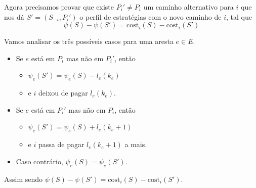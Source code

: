 \documentclass[12pt, letterpaper]{article}
\begin{document}
	Agora precisamos provar que existe $P_i' \neq P_i$ um caminho alternativo para $i$ que nos dá $S' = (S_{-i}, P_i')$ o perfil de estratégias com o novo caminho de $i$, tal que
	$$
		\psi(S) - \psi(S') = \textrm{cost}_i(S) - \textrm{cost}_i(S')
	$$

	Vamos analisar os três possíveis casos para uma aresta $e \in E$.
	\begin{itemize}
		\item{Se $e$ está em $P_i$ mas não em $P_i'$, então}
		\begin{itemize}
			\item{$\psi_e(S') = \psi_e(S) - l_e(k_e)$}
			\item{e $i$ deixou de pagar $l_e(k_e)$.}
		\end{itemize}
		\item{Se $e$ está em $P_i'$ mas não em $P_i$, então}
		\begin{itemize}
			\item{$\psi_e(S') = \psi_e(S) + l_e(k_e + 1)$}
			\item{e $i$ passa de pagar $l_e(k_e + 1)$ a mais.}
		\end{itemize}
		\item{Caso contrário, $\psi_e(S) = \psi_e(S')$.}
	\end{itemize}

	Assim sendo $\psi(S) - \psi(S') = \textrm{cost}_i(S) - \textrm{cost}_i(S')$.
\end{document}
